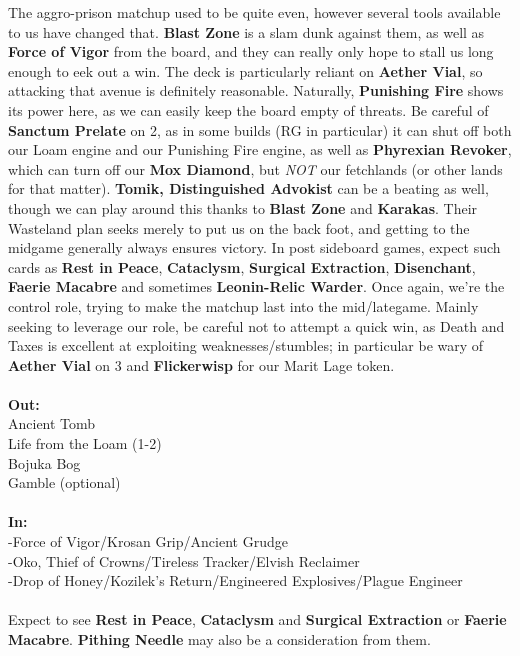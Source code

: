\documentclass{report}
\begin{document}
The aggro-prison matchup used to be quite even, however several tools available to us have changed that. \textbf{Blast Zone} is a slam dunk against them, as well as \textbf{Force of Vigor} from the board, and they can really only hope to stall us long enough to eek out a win. The deck is particularly reliant on \textbf{Aether Vial}, so attacking that avenue is definitely reasonable. Naturally, \textbf{Punishing Fire} shows its power here, as we can easily keep the board empty of threats. Be careful of \textbf{Sanctum Prelate} on 2, as in some builds (RG in particular) it can shut off both our Loam engine and our Punishing Fire engine, as well as \textbf{Phyrexian Revoker}, which can turn off our \textbf{Mox Diamond}, but \emph{NOT} our fetchlands (or other lands for that matter). \textbf{Tomik, Distinguished Advokist} can be a beating as well, though we can play around this thanks to \textbf{Blast Zone} and \textbf{Karakas}. Their Wasteland plan seeks merely to put us on the back foot, and getting to the midgame generally always ensures victory. In post sideboard games, expect such cards as \textbf{Rest in Peace}, \textbf{Cataclysm}, \textbf{Surgical Extraction}, \textbf{Disenchant}, \textbf{Faerie Macabre} and sometimes \textbf{Leonin-Relic Warder}. Once again, we're the control role, trying to make the matchup last into the mid/lategame. Mainly seeking to leverage our role, be careful not to attempt a quick win, as Death and Taxes is excellent at exploiting weaknesses/stumbles; in particular be wary of \textbf{Aether Vial} on 3 and \textbf{Flickerwisp} for our Marit Lage token.\\\\
\textbf{Out:}\\
Ancient Tomb\\Life from the Loam (1-2)\\Bojuka Bog\\Gamble (optional)\\\\
\textbf{In:}\\
-Force of Vigor/Krosan Grip/Ancient Grudge\\-Oko, Thief of Crowns/Tireless Tracker/Elvish Reclaimer\\-Drop of Honey/Kozilek's Return/Engineered Explosives/Plague Engineer\\\\
Expect to see \textbf{Rest in Peace}, \textbf{Cataclysm} and \textbf{Surgical Extraction} or \textbf{Faerie Macabre}. \textbf{Pithing Needle} may also be a consideration from them.\\\\
\end{document}
